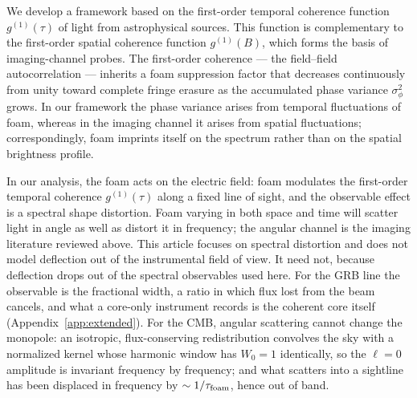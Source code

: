 \documentclass[aps,prd,onecolumn,amsmath,amssymb]{revtex4-2}
\begin{document}
We develop a framework based on the first-order temporal coherence
function $g^{(1)}(\tau)$ of light from astrophysical sources.
This function is complementary to the first-order spatial coherence
function $g^{(1)}(B)$, which forms the basis of imaging-channel probes.
The first-order coherence --- the field--field autocorrelation ---
inherits a foam suppression factor
that decreases continuously from unity toward complete fringe erasure as
the accumulated phase variance $\sigma_\phi^2$ grows.
In our framework the phase variance arises from temporal fluctuations of
foam, whereas in the imaging channel it arises from spatial
fluctuations; correspondingly, foam imprints itself on the
spectrum rather than on the spatial brightness profile.

In our analysis, the foam acts on the electric field: foam modulates the
first-order temporal coherence $g^{(1)}(\tau)$ along a fixed line of sight,
and the observable effect is a spectral shape distortion.  Foam varying in
both space and time will scatter light in angle as well as distort it in
frequency; the angular channel is the imaging literature reviewed above.
This article focuses on spectral distortion and does not model deflection out
of the instrumental field of view.  It need not, because deflection drops out
of the spectral observables used here.  For the GRB line the observable is
the fractional width, a ratio in which flux lost from the beam cancels, and
what a core-only instrument records is the coherent core itself
(Appendix~\ref{app:extended}).
For the CMB, angular scattering cannot change the monopole: an isotropic,
flux-conserving redistribution convolves the sky with a normalized kernel
whose harmonic window has $W_0=1$ identically, so the $\ell=0$ amplitude is
invariant frequency by frequency; and what scatters into a sightline has been
displaced in frequency by $\sim1/\tau_{\rm foam}$, hence out of band.
\end{document}
